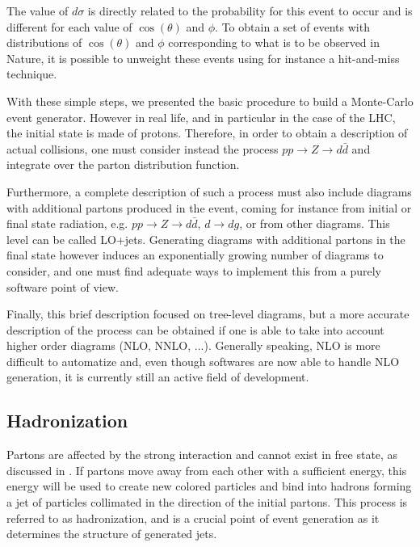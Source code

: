     The value of $d\sigma$ is directly related to the probability for this event
    to occur and is different for each value of $\cos(\theta)$ and $\phi$. To obtain
    a set of events with distributions of $\cos(\theta)$ and $\phi$ corresponding to
    what is to be observed in Nature, it is possible to unweight these events using
    for instance a hit-and-miss technique.

    With these simple steps, we presented the basic procedure to build a Monte-Carlo
    event generator. However in real life, and in particular in the case of the
    LHC, the initial state is made of protons. Therefore, in order to obtain a
    description of actual collisions, one must consider instead the process
    $pp \rightarrow Z \rightarrow d\bar{d}$ and integrate over the parton distribution
    function.

    Furthermore, a complete description of such a process must also include
    diagrams with additional partons produced in the event, coming for instance
    from initial or final state radiation, e.g. $pp \rightarrow Z \rightarrow
    d\bar{d}$, $d\rightarrow dg$, or from other diagrams. This level can be called
    LO+jets. Generating diagrams with additional partons in the final state however
    induces an exponentially growing number of diagrams to consider, and one must
    find adequate ways to implement this from a purely software point of view.

    Finally, this brief description focused on tree-level diagrams, but a more accurate
    description of the process can be obtained if one is able to take into account higher order
    diagrams (NLO, NNLO, ...). Generally speaking, NLO is more difficult to
    automatize and, even though softwares are now able to handle NLO generation, it is
    currently still an active field of development.

    \subsection{Hadronization}

    Partons are affected by the strong interaction and cannot exist in free state,
    as discussed in . If partons move away from
    each other with a sufficient energy, this energy will be used to create new colored
    particles and bind into hadrons forming a jet of particles collimated in the
    direction of the initial partons. This process is referred to as hadronization,
    and is a crucial point of event generation as it determines the structure
    of generated jets.

